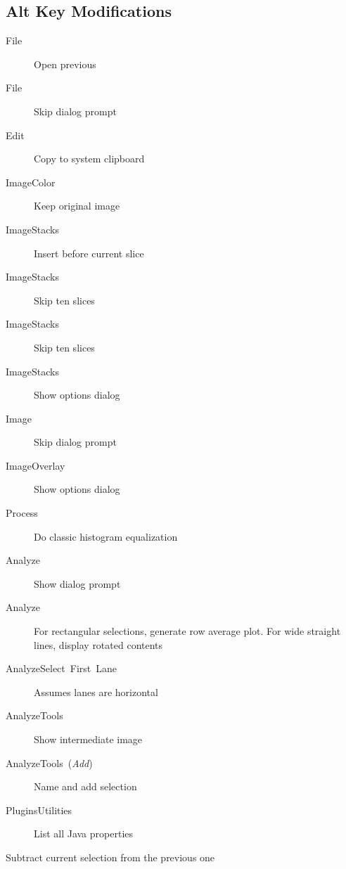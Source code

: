\subsection{Alt Key Modifications}
\begin{description}
\item [{\textsf{File\lyxarrow{}}}] Open previous
\item [{\textsf{File\lyxarrow{}}}] Skip dialog
prompt
\item [{\textsf{Edit\lyxarrow{}}}] Copy to system
clipboard
\item [{\textsf{Image\lyxarrow{}Color\lyxarrow{}}}] Keep
original image
\item [{\textsf{Image\lyxarrow{}Stacks\lyxarrow{}}}] Insert
before current slice 
\item [{\textsf{Image\lyxarrow{}Stacks\lyxarrow{}}}] Skip
ten slices 
\item [{\textsf{Image\lyxarrow{}Stacks\lyxarrow{}}}] Skip
ten slices 
\item [{\textsf{Image\lyxarrow{}Stacks\lyxarrow{}}}] Show
options dialog
\item [{\textsf{Image\lyxarrow{}}}] Skip
dialog prompt
\item [{\textsf{Image\lyxarrow{}Overlay\lyxarrow{}}}] Show
options dialog
\item [{\textsf{Process\lyxarrow{}}}] Do
classic histogram equalization
\item [{\textsf{Analyze\lyxarrow{}}}] Show dialog
prompt
\item [{\textsf{Analyze\lyxarrow{}}}] For
rectangular selections, generate row average plot. For wide straight
lines, display rotated contents 
\item [{\textsf{Analyze\lyxarrow{}Select\ First\ Lane}}] Assumes
lanes are horizontal
\item [{\textsf{Analyze\lyxarrow{}Tools\lyxarrow{}}}] Show
intermediate image 
\item [{\textsf{Analyze\lyxarrow{}Tools\lyxarrow{}\ (}\textsf{\emph{Add}}\textsf{)}}] Name
and add selection 
\item [{\textsf{Plugins\lyxarrow{}Utilities\lyxarrow{}}}] List
all Java properties
\end{description}
 Subtract current selection from
the previous one

